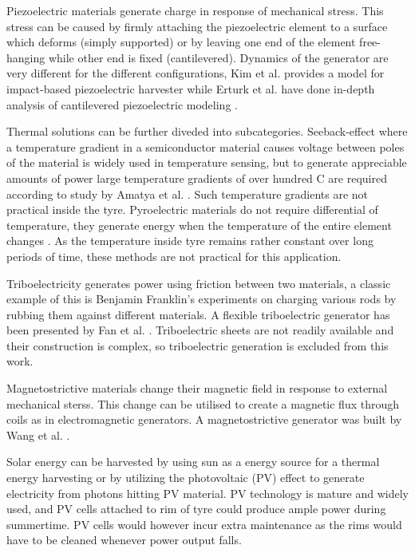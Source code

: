 Piezoelectric materials generate charge in response of mechanical stress. This stress can be caused by firmly attaching the piezoelectric element to a surface which deforms (simply supported) or by leaving one end of the element free-hanging while other end is fixed (cantilevered). Dynamics of the generator are very different for the different configurations, Kim et al. \cite{Kim2014a} provides a model for impact-based piezoelectric harvester while Erturk et al. have done in-depth analysis of cantilevered piezoelectric modeling \cite{Erturk2009}. 

Thermal solutions can be further diveded into subcategories. Seeback-effect where a temperature gradient in a semiconductor material causes voltage between poles of the material is widely used in temperature sensing, but to generate appreciable amounts of power large temperature gradients of over hundred \degree C are required according to study by Amatya et al. \cite{Amatya2010}. Such temperature gradients are not practical inside the tyre. Pyroelectric materials do not require differential of temperature, they generate energy when the temperature of the entire element changes \cite{Zhang2011}. As the temperature inside tyre remains rather constant over long periods of time, these methods are not practical for this application.

Triboelectricity generates power using friction between two materials, a classic example of this is Benjamin Franklin's experiments on charging various rods by rubbing them against different materials. A flexible triboelectric generator has been presented by Fan et al. \cite{Fan2012}. Triboelectric sheets are not readily available and their construction is complex, so triboelectric generation is excluded from this work. 

Magnetostrictive materials change their magnetic field in response to external mechanical sterss. This change can be utilised to create a magnetic flux through coils as in electromagnetic generators. A magnetostrictive generator was built by Wang et al. \cite{Wang2006}. 

Solar energy can be harvested by using sun as a energy source for a thermal energy harvesting or by utilizing the photovoltaic (PV) effect to generate electricity from photons hitting PV material. PV technology is mature and widely used, and PV cells attached to rim of tyre could produce ample power during summertime. PV cells would however incur extra maintenance as the rims would have to be cleaned whenever power output falls. 

